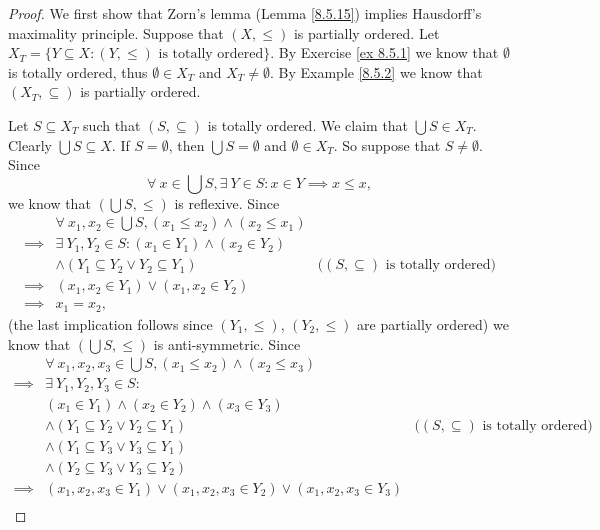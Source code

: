 \begin{proof}
    We first show that Zorn's lemma (Lemma \ref{8.5.15}) implies Hausdorff's maximality principle.
    Suppose that \((X, \leq)\) is partially ordered.
    Let \(X_T = \{Y \subseteq X : (Y, \leq) \text{ is totally ordered}\}\).
    By Exercise \ref{ex 8.5.1} we know that \(\emptyset\) is totally ordered, thus \(\emptyset \in X_T\) and \(X_T \neq \emptyset\).
    By Example \ref{8.5.2} we know that \((X_T, \subseteq)\) is partially ordered.

    Let \(S \subseteq X_T\) such that \((S, \subseteq)\) is totally ordered.
    We claim that \(\bigcup S \in X_T\).
    Clearly \(\bigcup S \subseteq X\).
    If \(S = \emptyset\), then \(\bigcup S = \emptyset\) and \(\emptyset \in X_T\).
    So suppose that \(S \neq \emptyset\).
    Since
    \[
        \forall\ x \in \bigcup S, \exists\ Y \in S : x \in Y \implies x \leq x,
    \]
    we know that \((\bigcup S, \leq)\) is reflexive.
    Since
    \begin{align*}
        & \forall\ x_1, x_2 \in \bigcup S, (x_1 \leq x_2) \land (x_2 \leq x_1) \\
        \implies & \exists\ Y_1, Y_2 \in S : (x_1 \in Y_1) \land (x_2 \in Y_2) \\
        & \land (Y_1 \subseteq Y_2 \lor Y_2 \subseteq Y_1) & \text{(\((S, \subseteq)\) is totally ordered)} \\
        \implies & (x_1, x_2 \in Y_1) \lor (x_1, x_2 \in Y_2) \\
        \implies & x_1 = x_2,
    \end{align*}
    (the last implication follows since \((Y_1, \leq)\), \((Y_2, \leq)\) are partially ordered)
    we know that \((\bigcup S, \leq)\) is anti-symmetric.
    Since
    \begin{align*}
        & \forall\ x_1, x_2, x_3 \in \bigcup S, (x_1 \leq x_2) \land (x_2 \leq x_3) \\
        \implies & \exists\ Y_1, Y_2, Y_3 \in S : \\
        & (x_1 \in Y_1) \land (x_2 \in Y_2) \land (x_3 \in Y_3) \\
        & \land (Y_1 \subseteq Y_2 \lor Y_2 \subseteq Y_1) & \text{(\((S, \subseteq)\) is totally ordered)} \\
        & \land (Y_1 \subseteq Y_3 \lor Y_3 \subseteq Y_1) \\
        & \land (Y_2 \subseteq Y_3 \lor Y_3 \subseteq Y_2) \\
        \implies & (x_1, x_2, x_3 \in Y_1) \lor (x_1, x_2, x_3 \in Y_2) \lor (x_1, x_2, x_3 \in Y_3) \\

\end{align*}
\end{proof}

